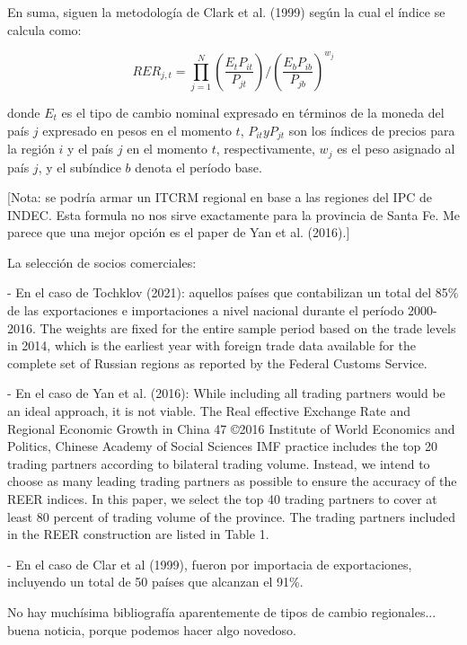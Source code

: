 En suma, siguen la metodología de Clark et al. (1999) según la cual el índice se calcula como:

\[
RER_{j,t} = \prod_{j=1}^{N} \left( \frac{E_{t}P_{it}}{P_{jt}} \right) / \left(  \frac{E_{b}P_{ib}}{P_{jb}} \right)^{w_j}
\]

donde $E_{t}$ es el tipo de cambio nominal expresado en términos de la moneda del país $j$ expresado en pesos en el momento $t$, $P_{it} y P_{jt}$ son los índices de precios para la región $i$ y el país $j$ en el momento $t$, respectivamente, $w_j$ es el peso asignado al país $j$, y el subíndice $b$ denota el período base.

[Nota: se podría armar un ITCRM regional en base a las regiones del IPC de INDEC. Esta formula no nos sirve exactamente para la provincia de Santa Fe. Me parece que una mejor opción es el paper de Yan et al. (2016).]

La selección de socios comerciales:

- En el caso de Tochklov (2021): aquellos países que contabilizan un total del 85\% de las exportaciones e importaciones a nivel nacional durante el período 2000-2016. The weights are fixed for the entire sample period based on the trade levels in 2014, which is the earliest
year with foreign trade data available for the complete set of Russian regions as reported by the
Federal Customs Service.

- En el caso de Yan et al. (2016): While including all trading partners would be an ideal approach, it is not viable. The
Real effective Exchange Rate and Regional Economic Growth in China 47 ©2016 Institute of World Economics and Politics, Chinese Academy of Social Sciences IMF practice includes the top 20 trading partners according to bilateral trading volume.
Instead, we intend to choose as many leading trading partners as possible to ensure the accuracy of the REER indices. In this paper, we select the top 40 trading partners to cover at least 80 percent of trading volume of the province. The trading partners included in the REER construction are listed in Table 1.

- En el caso de Clar et al (1999), fueron por importacia de exportaciones, incluyendo un total de 50 países que alcanzan el 91\%.

No hay muchísima bibliografía aparentemente de tipos de cambio regionales... buena noticia, porque podemos hacer algo novedoso.


